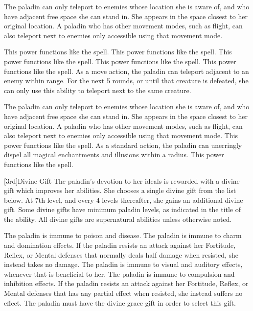The paladin can only teleport to enemies whose location she is aware of, and who have adjacent free space she can stand in.
She appears in the space closest to her original location.
A paladin who has other movement modes, such as flight, can also teleport next to enemies only accessible using that movement mode.

 This power functions like the 
spell.
 This power functions like the 
spell.
 This power functions like the 
spell.
 This power functions like the 
spell.
 This power functions like the 
spell.
As a move action, the paladin can teleport adjacent to an enemy within \rngmed range.
For the next 5 rounds, or until that creature is defeated, she can only use this ability to teleport next to the same creature.

The paladin can only teleport to enemies whose location she is aware of, and who have adjacent free space she can stand in.
She appears in the space closest to her original location.
A paladin who has other movement modes, such as flight, can also teleport next to enemies only accessible using that movement mode.
 This power functions like the 
spell.
As a standard action, the paladin can unerringly dispel all magical enchantments and illusions within a \arealarge radius.
 This power functions like the 
spell.

[3rd]{Divine Gift}
The paladin's devotion to her ideals is rewarded with a divine gift which improves her abilities.
She chooses a single divine gift from the list below.
At 7th level, and every 4 levels thereafter, she gains an additional divine gift.
Some divine gifts have minimum paladin levels, as indicated in the title of the ability.
All divine gifts are supernatural abilities unless otherwise noted.

The paladin is immune to poison and disease.
The paladin is immune to charm and domination effects.
If the paladin resists an attack against her Fortitude, Reflex, or Mental defenses that normally deals half damage when resisted, she instead takes no damage.
The paladin is immune to visual and auditory effects, whenever that is beneficial to her.
The paladin is immune to compulsion and inhibition effects.
If the paladin resists an attack against her Fortitude, Reflex, or Mental defenses that has any partial effect when resisted, she instead suffers no effect.
The paladin must have the divine grace gift in order to select this gift.

